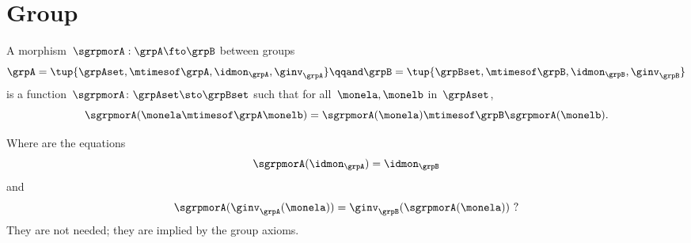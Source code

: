 
\section{Group \whomos}


\begin{ctdefinition}
    \label{def:group-mor}
    A morphism~$\sgrpmorA: \grpA \fto \grpB$ between groups
    \begin{equation}
        \grpA = \tup{\grpAset, \mtimesof\grpA, \idmon_\grpA, \ginv_\grpA}
        \qqand
        \grpB = \tup{\grpBset, \mtimesof\grpB, \idmon_\grpB,  \ginv_\grpB}
    \end{equation}
    is a function~$\sgrpmorA \colon \grpAset \sto \grpBset$ such that for all~$\monela, \monelb$ in~$\grpAset$,
    \begin{equation}
        \label{eq:group-mor-comp}
        \sgrpmorA (\monela \mtimesof\grpA \monelb) = \sgrpmorA (\monela) \mtimesof\grpB  \sgrpmorA(\monelb).
    \end{equation}
\end{ctdefinition}

Where are the equations
\begin{equation}
    \label{eq:grp-id-comp}
    \sgrpmorA (\idmon_\grpA) = \idmon_{\grpB}
\end{equation}
and
\begin{equation}
    \label{eq:grp-inv-comp}
    \sgrpmorA (\ginv_\grpA(\monela)) = \ginv_\grpB(\sgrpmorA(\monela)) \ ?
\end{equation}
%
They are not needed; they are implied by the group axioms.

